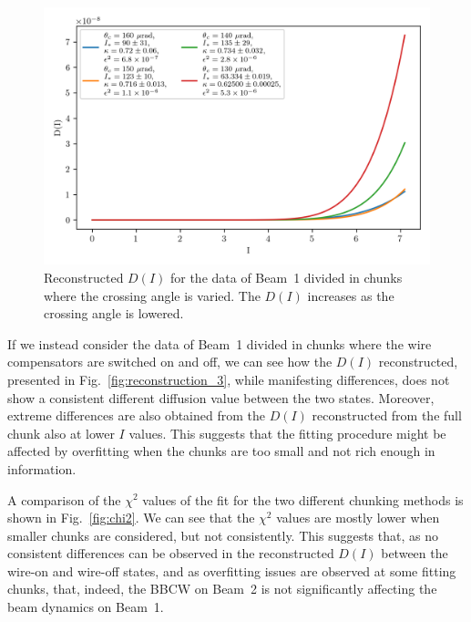 \begin{figure}[hpt]
    \centering
    \includegraphics[width=1.0\textwidth]{5_wire_compensators_LHC/figs/fokker_planck_b1_D.png}
    \caption{Reconstructed $D(I)$ for the data of Beam~1 divided in chunks where the crossing angle is varied. The $D(I)$ increases as the crossing angle is lowered.}
    \label{fig:reconstruction_2}
\end{figure}


If we instead consider the data of Beam~1 divided in chunks where the wire compensators are switched on and off, we can see how the $D(I)$ reconstructed, presented in Fig.~\ref{fig:reconstruction_3}, while manifesting differences, does not show a consistent different diffusion value between the two states. Moreover, extreme differences are also obtained from the $D(I)$ reconstructed from the full chunk also at lower $I$ values. This suggests that the fitting procedure might be affected by overfitting when the chunks are too small and not rich enough in information.

A comparison of the $\chi^2$ values of the fit for the two different chunking methods is shown in Fig.~\ref{fig:chi2}. We can see that the $\chi^2$ values are mostly lower when smaller chunks are considered, but not consistently. This suggests that, as no consistent differences can be observed in the reconstructed $D(I)$ between the wire-on and wire-off states, and as overfitting issues are observed at some fitting chunks, that, indeed, the BBCW on Beam~2 is not significantly affecting the beam dynamics on Beam~1.

